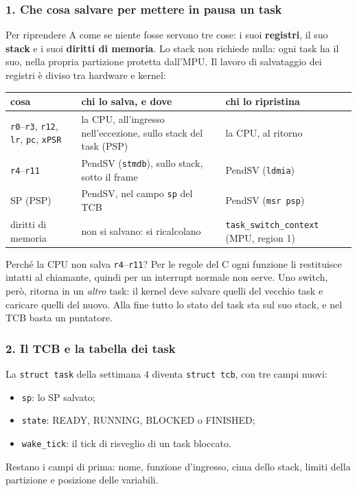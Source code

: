 \subsubsection*{1. Che cosa salvare per mettere in pausa un task}
Per riprendere A come se niente fosse servono tre cose: i suoi \textbf{registri}, il suo \textbf{stack} e i suoi \textbf{diritti di memoria}. Lo stack non richiede nulla: ogni task ha il suo, nella propria partizione protetta dall'MPU. Il lavoro di salvataggio dei registri è diviso tra hardware e kernel:
\begin{center}
\small
\begin{tabular}{l l l}
    \hline
    \textbf{cosa} & \textbf{chi lo salva, e dove} & \textbf{chi lo ripristina} \\
    \hline
    \texttt{r0}--\texttt{r3}, \texttt{r12}, \texttt{lr}, \texttt{pc}, \texttt{xPSR} & la CPU, all'ingresso nell'eccezione, sullo stack del task (PSP) & la CPU, al ritorno \\
    \texttt{r4}--\texttt{r11} & PendSV (\texttt{stmdb}), sullo stack, sotto il frame & PendSV (\texttt{ldmia}) \\
    SP (PSP) & PendSV, nel campo \texttt{sp} del TCB & PendSV (\texttt{msr psp}) \\
    diritti di memoria & non si salvano: si ricalcolano & \texttt{task\_switch\_context} (MPU, region 1) \\
    \hline
\end{tabular}
\end{center}
Perché la CPU non salva \texttt{r4}--\texttt{r11}? Per le regole del C ogni funzione li restituisce intatti al chiamante, quindi per un interrupt normale non serve. Uno switch, però, ritorna in un \emph{altro} task: il kernel deve salvare quelli del vecchio task e caricare quelli del nuovo. Alla fine tutto lo stato del task sta sul suo stack, e nel TCB basta un puntatore.

\subsubsection*{2. Il TCB e la tabella dei task}
La \texttt{struct task} della settimana 4 diventa \texttt{struct tcb}, con tre campi nuovi:
\begin{itemize}
    \item \texttt{sp}: lo SP salvato;
    \item \texttt{state}: READY, RUNNING, BLOCKED o FINISHED;
    \item \texttt{wake\_tick}: il tick di risveglio di un task bloccato.
\end{itemize}
Restano i campi di prima: nome, funzione d'ingresso, cima dello stack, limiti della partizione e posizione delle variabili.

